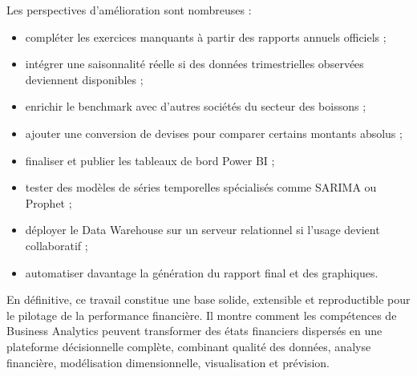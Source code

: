 \medskip
Les perspectives d'amélioration sont nombreuses :
\begin{itemize}[noitemsep]
  \item compléter les exercices manquants à partir des rapports annuels officiels ;
  \item intégrer une saisonnalité réelle si des données trimestrielles observées deviennent disponibles ;
  \item enrichir le benchmark avec d'autres sociétés du secteur des boissons ;
  \item ajouter une conversion de devises pour comparer certains montants absolus ;
  \item finaliser et publier les tableaux de bord Power BI ;
  \item tester des modèles de séries temporelles spécialisés comme SARIMA ou Prophet ;
  \item déployer le Data Warehouse sur un serveur relationnel si l'usage devient collaboratif ;
  \item automatiser davantage la génération du rapport final et des graphiques.
\end{itemize}

\medskip
En définitive, ce travail constitue une base solide, extensible et reproductible
pour le pilotage de la performance financière. Il montre comment les compétences
de Business Analytics peuvent transformer des états financiers dispersés en une
plateforme décisionnelle complète, combinant qualité des données, analyse
financière, modélisation dimensionnelle, visualisation et prévision.
